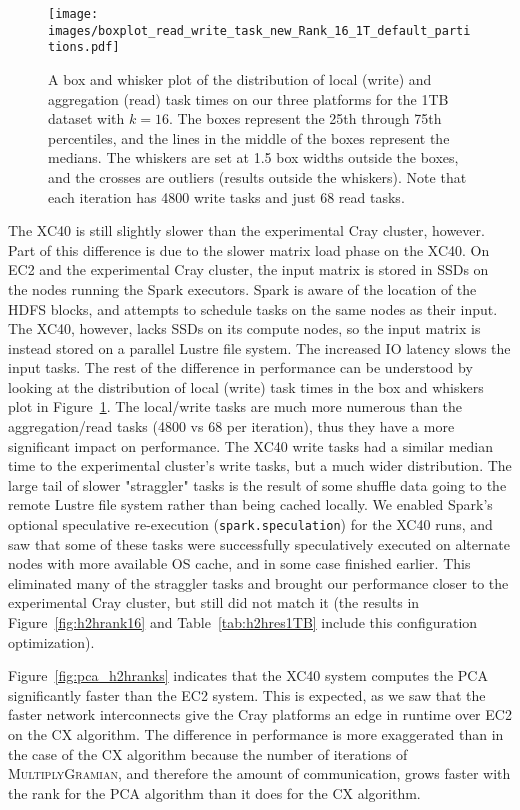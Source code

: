    \begin{figure}
    \begin{centering}
    \texttt{[image: images/boxplot\_read\_write\_task\_new\_Rank\_16\_1T\_default\_partitions.pdf]}
    \end{centering}
    \caption{A box and whisker plot of the distribution of local (write) and aggregation (read) task times on our three platforms for the 1TB dataset with $k=16$.  The boxes represent the 25th through 75th percentiles, and the lines in the middle of the boxes represent the medians.  The whiskers are set at 1.5 box widths outside the boxes, and the crosses are outliers (results outside the whiskers).  Note that each iteration has 4800 write tasks and just 68 read tasks.}
    \label{fig:rwtaskdist} 
    \end{figure}

The XC40 is still slightly slower than the experimental Cray cluster, however.
Part of this difference is due to the slower matrix load phase on the XC40.  On
EC2 and the experimental Cray cluster, the input matrix is stored in SSDs on
the nodes running the Spark executors.  Spark is aware of the location of the
HDFS blocks, and attempts to schedule tasks on the same nodes as their input.
The XC40, however, lacks SSDs on its compute nodes, so the input matrix is
instead stored on a parallel Lustre file system.  The increased IO latency
slows the input tasks. The rest of the difference in performance can be
understood by looking at the distribution of local (write) task times in the
box and whiskers plot in Figure~\ref{fig:rwtaskdist}.  The local/write tasks
are much more numerous than the aggregation/read tasks (4800 vs 68 per
iteration), thus they have a more significant impact on performance.  
The XC40 write tasks had a similar median time to the experimental
cluster's write tasks, but a much wider distribution.  The large tail of slower
"straggler" tasks is the result of some shuffle data going to the remote Lustre
file system rather than being cached locally. We enabled Spark's optional
speculative re-execution (\texttt{spark.speculation}) for the XC40 runs, and
saw that some of these tasks were successfully speculatively executed on
alternate nodes with more available OS cache, and in some case finished
earlier.  This eliminated many of the straggler tasks and brought our
performance closer to the experimental Cray cluster, but still did not match it
(the results in Figure~\ref{fig:h2hrank16} and Table~\ref{tab:h2hres1TB}
include this configuration optimization). 

Figure~\ref{fig:pca_h2hranks} indicates that the XC40 system computes the PCA
significantly faster than the EC2 system. This is expected, as we saw
that the faster network interconnects give the Cray platforms
an edge in runtime over EC2 on the CX algorithm. The difference in performance is more exaggerated
than in the case of the CX algorithm because the number of iterations
of \textsc{MultiplyGramian}, and therefore the amount of communication, grows
faster with the rank for the PCA algorithm than it does for the CX algorithm.
